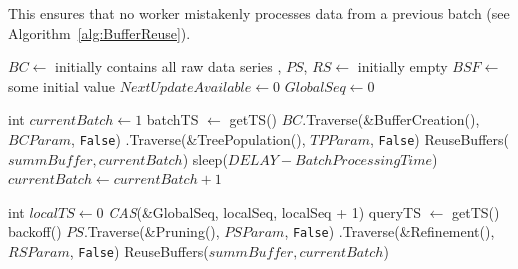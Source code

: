\documentclass[a4paper,11pt,twoside,openany]{book}
\newcommand{\CAS}{\mbox{\textit{CAS}}}
\newcommand{\False}{\mbox{\texttt{False}}}
\newcommand{\Traverse}{\mbox{\sc Traverse}}
\newcommand{\BC}{\mbox{$\mathit{BC}$}}
\newcommand{\PS}{\mbox{$\mathit{PS}$}}
\newcommand{\RS}{\mbox{$\mathit{RS}$}}
\begin{document}
This ensures that no worker mistakenly processes data from a previous batch
(see Algorithm~\ref{alg:BufferReuse}).  


\begin{algorithm}[htbp]
    \footnotesize
    \vspace*{2mm}
    
    \begin{algorithmic}[1]
    
        \State \BC $\gets$ initially contains all raw data series
        \State \TP, \PS, \RS $\gets$ initially empty
        \State $\mathit{BSF} \gets$ some initial value
        \State $\mathit{NextUpdateAvailable} \gets 0$
        \State $\mathit{GlobalSeq} \gets 0$
    \EndProcedure
    
    \vspace*{1mm}
    \vspace*{1mm}
    
        \State int $\mathit{currentBatch} \gets 1$
                \State batchTS $\gets$ getTS()
            \EndIf
            \State \BC.\Traverse(\&BufferCreation(), $\mathit{BCParam}$, \False)
            \State \TP.\Traverse(\&TreePopulation(), $\mathit{TPParam}$, \False)
                \State ReuseBuffers($\mathit{summBuffer}, \mathit{currentBatch}$)
            \EndFor
                \State sleep($\mathit{DELAY}-\mathit{BatchProcessingTime}$)
            \EndIf
            \State $\mathit{currentBatch} \gets \mathit{currentBatch} + 1$
        \EndWhile
    \EndProcedure
    
    \vspace*{1mm}
    \vspace*{1mm}
    
        \State int $\mathit{localTS} \gets 0$
                    \State \CAS(\&GlobalSeq, localSeq, localSeq + 1)
                \EndIf
                \State queryTS $\gets$ getTS()
                    \State backoff()
                \EndWhile
            \EndIf
            \State \PS.\Traverse(\&Pruning(), $\mathit{PSParam}$, \False)
            \State \TP.\Traverse(\&Refinement(), $\mathit{RSParam}$, \False)
                \State ReuseBuffers($\mathit{summBuffer}, \mathit{currentBatch}$)
            \EndFor
            

\end{algorithmic}
\end{algorithm}
\end{document}
